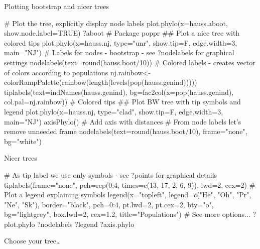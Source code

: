\documentclass[compress, ucs, xelatex, 11pt, xcolor=svgnames, aspectratio=169,
	hyperref={
		bookmarks=true,
		unicode=true,
		colorlinks=true,
		pdftitle={Molecular data in R},
		plainpages=false,
		pdfauthor={Vojtech Zeisek},
		pdfsubject={Course about phylogeny and evolution in R},
		pdfcreator={XeLaTeX},
		pdfkeywords={R, evolution, phylogeny, molecular data},
		linkcolor=Crimson, %
		anchorcolor=Magenta, %
		citecolor=Magenta, %
		filecolor=Magenta, %
		menucolor=Magenta, %
		urlcolor=DodgerBlue, %
		pdftex},
	url={hyphens, lowtilde} %
	]{beamer}
\renewcommand{\texttt}[1]{\colorbox{Beige}{{\ttfamily #1}}}
\begin{document}
\begin{frame}[fragile]{Plotting bootstrap and nicer trees}
	\begin{spluscode}
    # Plot the tree, explicitly display node labels
    plot.phylo(x=hauss.aboot, show.node.label=TRUE)
    ?aboot # Package poppr
    ## Plot a nice tree with colored tips
    plot.phylo(x=hauss.nj, type="unr", show.tip=F, edge.width=3, main="NJ")
    # Labels for nodes - bootstrap - see ?nodelabels for graphical settings
    nodelabels(text=round(hauss.boot/10))
    # Colored labels - creates vector of colors according to populations
    nj.rainbow<-colorRampPalette(rainbow(length(levels(pop(hauss.genind)))))
    tiplabels(text=indNames(hauss.genind), bg=fac2col(x=pop(hauss.genind),
      col.pal=nj.rainbow)) # Colored tips
    ## Plot BW tree with tip symbols and legend
    plot.phylo(x=hauss.nj, type="clad", show.tip=F, edge.width=3, main="NJ")
    axisPhylo() # Add axis with distances
    # From node labels let's remove unneeded frame
    nodelabels(text=round(hauss.boot/10), frame="none", bg="white")
	\end{spluscode}
\end{frame}

\begin{frame}[fragile]{Nicer trees}
	\begin{spluscode}
    # As tip label we use only symbols - see ?points for graphical details
    tiplabels(frame="none", pch=rep(0:4, times=c(13, 17, 2, 6, 9)), lwd=2,
      cex=2)
    # Plot a legend explaining symbols
    legend(x="topleft", legend=c("He", "Oh", "Pr", "Ne", "Sk"),
      border="black", pch=0:4, pt.lwd=2, pt.cex=2, bty="o", bg="lightgrey",
      box.lwd=2, cex=1.2, title="Populations")
    # See more options...
    ?plot.phylo
    ?nodelabels
    ?legend
    ?axis.phylo
	\end{spluscode}
\end{frame}

\begin{frame}{Choose your tree\ldots}
	\begin{center}
		\texttt{[image: nj2.png]}
	\end{center}
\end{frame}
\end{document}
